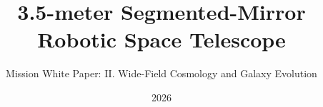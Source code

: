 \title{3.5-meter Segmented-Mirror Robotic Space Telescope}
\newcommand{\wpvolumelabel}{II}
\newcommand{\wpvolumetitle}{Wide-Field Cosmology and Galaxy Evolution}
\subtitle{Mission White Paper: \wpvolumelabel. \wpvolumetitle}
\newcommand{\wpauthors}{Juhan Kim, Yong-Woo Kang, Sang Hyun Lee, Jeong-Yeol Han, Sungwook E. Hong, Bongkon Moon, Donguk Song, Juhyung Kang, Myeong-Gu Park, Sang Chul Kim, Chung-Uk Lee, Sangmo Tony Sohn, Arman Shafieloo, David Parkinson, Hong Soo Park, Dohyeong Kim, Chan Park, Jungjoo Sohn, Young-Beom Jeon, Jong-Hak Woo, Hyung Mok Lee, Hong Bae Ann, Myungkook James Jee, Mansoo Choi, Changbom Park}
\date{2026}
\newcommand{\wpchapteroffset}{0}
\newcommand{\MakeVolumeBody}{%
  \definecolor{Blue1}{HTML}{9488AD}%
  \definecolor{Blue2}{HTML}{6F6295}%
  \definecolor{Blue3}{HTML}{514670}%
  }
